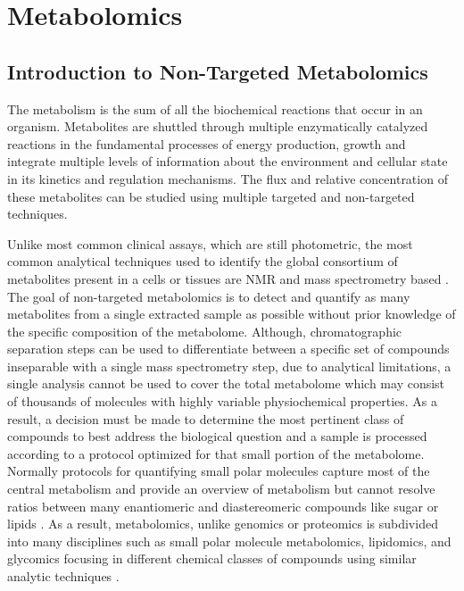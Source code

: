 \documentclass[a4paper,11pt,twoside]{book}
\begin{document}
	\chapter{Metabolomics}
	
	\section{Introduction to Non-Targeted Metabolomics}
	
	The metabolism is the sum of all the biochemical reactions that occur in an organism. Metabolites are shuttled through multiple enzymatically catalyzed reactions in the fundamental processes of energy production, growth and integrate multiple levels of information about the environment and cellular state in its kinetics and regulation mechanisms. The flux and relative concentration of these metabolites can be studied using multiple targeted and non-targeted techniques\citep{Aksenov2017GlobalSpectrometry}. 
	
    Unlike most common clinical assays, which are still photometric, the most common analytical techniques used to identify the global consortium of metabolites present in a cells or tissues are NMR and mass spectrometry based \citep{StanfordBloodTests}. The goal of non-targeted metabolomics is to detect and quantify as many metabolites from a single extracted sample as possible without prior knowledge of the specific composition of the metabolome. Although, chromatographic separation steps can be used to differentiate between a specific set of compounds inseparable with a single mass spectrometry step, due to analytical limitations, a single analysis cannot be used to cover the total metabolome which may consist of thousands of molecules with highly variable physiochemical properties. As a result, a decision must be made to determine the most pertinent class of compounds to best address the biological question and a sample is processed according to a protocol optimized for that small portion of the metabolome. Normally protocols for quantifying small polar molecules capture most of the central metabolism and provide an overview of metabolism but cannot resolve ratios between many enantiomeric and diastereomeric compounds like sugar or lipids \citep{FGCZ2017MetabolomicsZurich}. As a result, metabolomics, unlike genomics or proteomics is subdivided into many disciplines such as small polar molecule metabolomics, lipidomics, and glycomics focusing in different chemical classes of compounds using similar analytic techniques \citep{FGCZ2017MetabolomicsZurich}.
	
\end{document}
